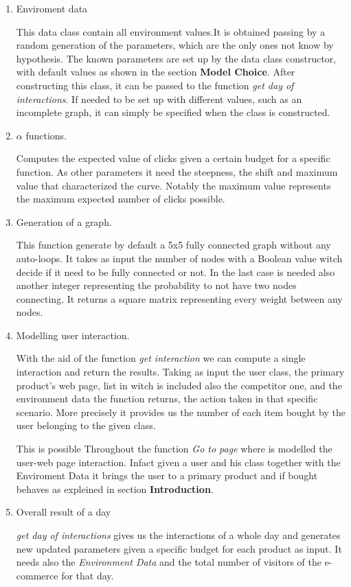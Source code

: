  \begin{enumerate}
     \item  Enviroment data
     
     This data class contain all environment values.It is obtained passing by a random generation of the parameters, which are the only ones not know by hypothesis. The known parameters are set up by the data class constructor, with default values as shown in the section \textbf{Model Choice}. After constructing this class, it can be passed to the function  \textit{get day of interactions}. If needed to be set up with different values, such as an incomplete graph, it can simply be specified when the class is constructed.
    
     \item  $\alpha$ functions.
     
     Computes the expected value of clicks given a certain budget for a specific function. As other parameters it need the steepness, the shift and maximum value that characterized the curve. Notably the maximum value represents the maximum expected number of clicks possible.
  
    \item Generation of a graph.
    
    This function generate by default a 5x5 fully connected graph without any auto-loops. It takes as input the number of nodes with a Boolean value witch decide if it need to be fully connected or not. In the last case is needed also another integer representing the probability to not have two nodes connecting. It returns a square matrix representing every weight between any nodes.
   
    \item Modelling user interaction.
    
    With the aid of the function \textit{get interaction} we can compute a single interaction and return the results. Taking as input the user class, the primary product's web page, list in witch is included also the competitor one, and the environment data the function returns, the action taken in that specific scenario. More precisely it provides us the number of each item bought by the user belonging to the given class.
    
    This is possible Throughout the function \textit{Go to page} where is modelled the user-web page interaction. Infact given a user and his class together with the Enviroment Data it brings the user to a primary product and if bought behaves as expleined in section \textbf{Introduction}.
    
    \item Overall result of a day
    
    \textit{get day of interactions} gives us the interactions of a whole day and generates new updated parameters given a specific budget for each product as input. It needs also the \textit{Environment Data} and the total number of visitors of the e-commerce for that day.
    
\end{enumerate}


